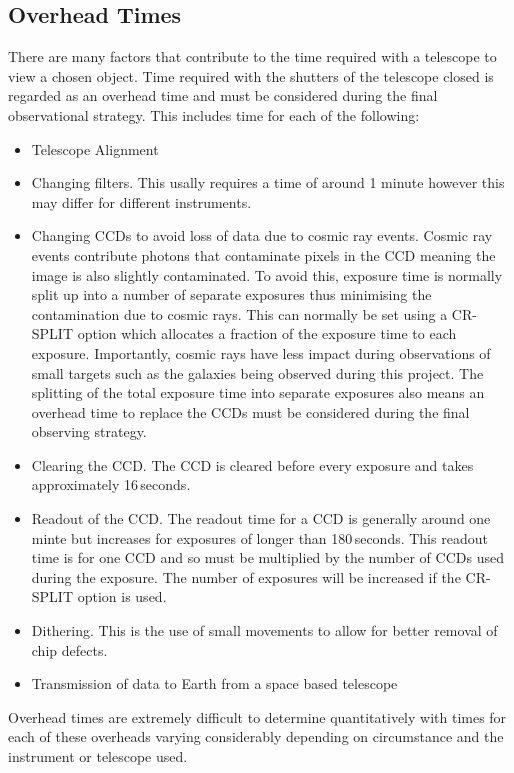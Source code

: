 	\subsection{Overhead Times} %
	\label{sub:overhead_times}
		There are many factors that contribute to the time required with a telescope to view a chosen object. Time required with the shutters of the telescope closed is regarded as an overhead time and must be considered during the final observational strategy. This includes time for each of the following\cite{Overhead_Times}:
		\begin{itemize}
			\item Telescope Alignment
			\item Changing filters. This usally requires a time of around 1 minute however this may differ for different instruments.
			\item Changing CCDs to avoid loss of data due to cosmic ray events. Cosmic ray events contribute photons that contaminate pixels in the CCD meaning the image is also slightly contaminated. To avoid this, exposure time is normally split up into a number of separate exposures thus minimising the contamination due to cosmic rays. This can normally be set using a CR-SPLIT option which allocates a fraction of the exposure time to each exposure\cite{Space_Telescope_Science_cosmic_ray}. Importantly, cosmic rays have less impact during observations of small targets such as the galaxies being observed during this project. The splitting of the total exposure time into separate exposures also means an overhead time to replace the CCDs must be considered during the final observing strategy.
			\item Clearing the CCD. The CCD is cleared before every exposure and takes approximately 16\,seconds.
			\item Readout of the CCD. The readout time for a CCD is generally around one minte but increases for exposures of longer than 180\,seconds. This readout time is for one CCD and so must be multiplied by the number of CCDs used  during the exposure. The number of exposures will be increased if the CR-SPLIT option is used.
			\item Dithering. This is the use of small movements to allow for better removal of chip defects.
			\item Transmission of data to Earth from a space based telescope
		\end{itemize}
		Overhead times are extremely difficult to determine quantitatively with times for each of these overheads varying considerably depending on circumstance and the instrument or telescope used.

